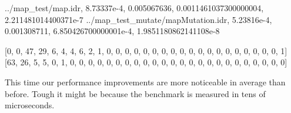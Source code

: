 \documentclass[
]{article}
\newenvironment{Shaded}{}{}
\newcommand{\DecValTok}[1]{\textcolor[rgb]{0.25,0.63,0.44}{#1}}
\newcommand{\FloatTok}[1]{\textcolor[rgb]{0.25,0.63,0.44}{#1}}
\newcommand{\FunctionTok}[1]{\textcolor[rgb]{0.02,0.16,0.49}{#1}}
\newcommand{\NormalTok}[1]{#1}
\newcommand{\OperatorTok}[1]{\textcolor[rgb]{0.40,0.40,0.40}{#1}}
\begin{document}
\begin{Shaded}
\begin{Highlighting}[]
\OperatorTok{../}\NormalTok{map\_test}\OperatorTok{/}\FunctionTok{map}\OperatorTok{.}\NormalTok{idr,}
\FloatTok{8.73337e{-}4}\NormalTok{,}
\FloatTok{0.005067636}\NormalTok{,}
\FloatTok{0.0011461037300000004}\NormalTok{,}
\FloatTok{2.211481014400371e{-}7}
\OperatorTok{../}\NormalTok{map\_test\_mutate}\OperatorTok{/}\NormalTok{mapMutation}\OperatorTok{.}\NormalTok{idr,}
\FloatTok{5.23816e{-}4}\NormalTok{,}
\FloatTok{0.001308711}\NormalTok{,}
\FloatTok{6.850426700000001e{-}4}\NormalTok{,}
\FloatTok{1.9851180862141108e{-}8}

\NormalTok{[}\DecValTok{0}\NormalTok{, }\DecValTok{0}\NormalTok{, }\DecValTok{47}\NormalTok{, }\DecValTok{29}\NormalTok{, }\DecValTok{6}\NormalTok{, }\DecValTok{4}\NormalTok{, }\DecValTok{4}\NormalTok{, }\DecValTok{6}\NormalTok{, }\DecValTok{2}\NormalTok{, }\DecValTok{1}\NormalTok{, }\DecValTok{0}\NormalTok{, }\DecValTok{0}\NormalTok{, }\DecValTok{0}\NormalTok{, }\DecValTok{0}\NormalTok{, }\DecValTok{0}\NormalTok{, }\DecValTok{0}\NormalTok{, }\DecValTok{0}\NormalTok{, }
\DecValTok{0}\NormalTok{, }\DecValTok{0}\NormalTok{, }\DecValTok{0}\NormalTok{, }\DecValTok{0}\NormalTok{, }\DecValTok{0}\NormalTok{, }\DecValTok{0}\NormalTok{, }\DecValTok{0}\NormalTok{, }\DecValTok{0}\NormalTok{, }\DecValTok{0}\NormalTok{, }\DecValTok{0}\NormalTok{, }\DecValTok{0}\NormalTok{, }\DecValTok{0}\NormalTok{, }\DecValTok{1}\NormalTok{]}
\NormalTok{[}\DecValTok{63}\NormalTok{, }\DecValTok{26}\NormalTok{, }\DecValTok{5}\NormalTok{, }\DecValTok{5}\NormalTok{, }\DecValTok{0}\NormalTok{, }\DecValTok{1}\NormalTok{, }\DecValTok{0}\NormalTok{, }\DecValTok{0}\NormalTok{, }\DecValTok{0}\NormalTok{, }\DecValTok{0}\NormalTok{, }\DecValTok{0}\NormalTok{, }\DecValTok{0}\NormalTok{, }\DecValTok{0}\NormalTok{, }\DecValTok{0}\NormalTok{, }\DecValTok{0}\NormalTok{, }\DecValTok{0}\NormalTok{, }\DecValTok{0}\NormalTok{, }
\DecValTok{0}\NormalTok{, }\DecValTok{0}\NormalTok{, }\DecValTok{0}\NormalTok{, }\DecValTok{0}\NormalTok{, }\DecValTok{0}\NormalTok{, }\DecValTok{0}\NormalTok{, }\DecValTok{0}\NormalTok{, }\DecValTok{0}\NormalTok{, }\DecValTok{0}\NormalTok{, }\DecValTok{0}\NormalTok{, }\DecValTok{0}\NormalTok{, }\DecValTok{0}\NormalTok{, }\DecValTok{0}\NormalTok{]}
\end{Highlighting}
\end{Shaded}

This time our performance improvements are more noticeable in average
than before. Tough it might be because the benchmark is measured in tens
of microseconds.
\end{document}
